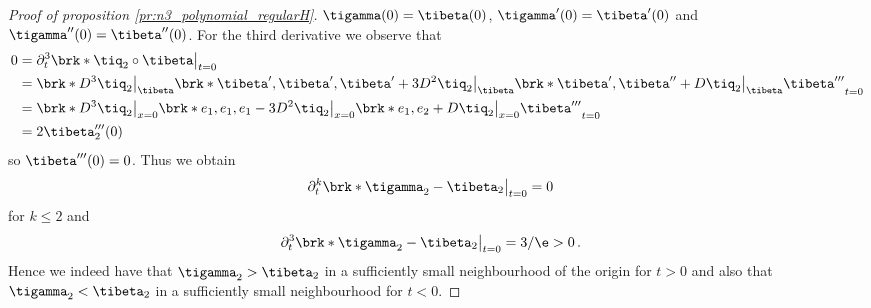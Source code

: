 \begin{proof}[Proof of proposition \ref{pr:n3_polynomial_regularH}]
  $\tigamma(0)=\tibeta(0)$, $\tigamma'(0)=\tibeta'(0)$ and $\tigamma''(0)=\tibeta''(0)$.
  For the third derivative we observe that
  \begin{align*}
    0&=\partial_t^3\brk*{\tiq_2\circ\tibeta}\big\vert_{t=0} \\
    &=\brk*{D^3\tiq_2\big\vert_{\tibeta}\brk*{\tibeta',\tibeta',\tibeta'}
    +3D^2\tiq_2\big\vert_{\tibeta}\brk*{\tibeta',\tibeta''}
    +D\tiq_2\big\vert_{\tibeta}\tibeta'''}_{t=0} \\
    &=\brk*{D^3\tiq_2\big\vert_{x=0}\brk*{e_1,e_1,e_1}
    -3D^2\tiq_2\big\vert_{x=0}\brk*{e_1,e_2}
    +D\tiq_2\big\vert_{x=0}\tibeta'''}_{t=0} \\
    &=2\tibeta_2'''(0)
  \end{align*}
  so $\tibeta'''(0)=0$.
  Thus we obtain
  \begin{align*}
    \partial_t^k\brk*{\tigamma_2-\tibeta_2}\big\vert_{t=0}&=0 
  \end{align*}
  for $k\leq2$ and
  \begin{align*}
    \partial_t^3\brk*{\tigamma_2-\tibeta_2}\big\vert_{t=0}&=3/\e>0\,.
  \end{align*}
  Hence we indeed have that $\tigamma_2>\tibeta_2$ in a sufficiently small neighbourhood of the origin for $t>0$
  and also that  $\tigamma_2<\tibeta_2$ in a sufficiently small neighbourhood for $t<0$.


\end{proof}
